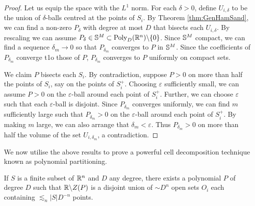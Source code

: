\begin{proof}
    Let us equip the space with the $L^1$ norm.
    For each $\delta>0$, define $U_{i, \delta}$ to be the union of $\delta$-balls centred at the points of $S_i$. 
    By Theorem \ref{thm:GenHamSand}, we can find a non-zero $P_{\delta}$ with degree at most $D$ that bisects each $U_{i, \delta}$. 
    By rescaling we can assume $P_{\delta} \in \mathbb S^M \subset \text{Poly}_D (\mathbb R^n) \backslash \{0\}$.
    Since $\mathbb S^M$ compact, we can find a sequence $\delta_m \to 0$ so that $P_{\delta_{m}}$ converges to $P$ in $\mathbb S^M$.
    Since the coefficients of $P_{\delta_{m}}$ converge t1o those of $P$, $P_{\delta_{m}}$ converges to $P$ uniformly on compact sets.

    We claim $P$ bisects each $S_i$. 
    By contradiction, suppose $P>0$ on more than half the points of $S_i$, say on the points of $S_i^+$. 
    Choosing $\varepsilon$ sufficiently small, we can assume $P>0$ on the $\varepsilon$-ball around each point of $S_i^+$.
    Further, we can choose $\varepsilon$ such that each $\varepsilon$-ball is disjoint. 
    Since $P_{\delta_{m}}$ converges uniformly, we can find $m$ sufficiently large such that $P_{\delta_{m}}>0$ 
    on the $\varepsilon$-ball around each point of $S_i^+$.
    By making $m$ large, we can also arrange that $\delta_m < \varepsilon$.
    Thus $P_{\delta_{m}} > 0$ on more than half the volume of the set $U_{i, \delta_{m}}$, a contradiction. 
\end{proof}
We now utilise the above results to prove a powerful cell decomposition technique known as polynomial partitioning.
\begin{theorem}
    If $S$ is a finite subset of $\mathbb R^n$ and $D$ any degree, there exists
    a polynomial $P$ of degree $D$ such that $\mathbb R \backslash Z(P)$ is a disjoint union of $\sim D^n$ open sets $O_i$ each containing
    $\lesssim_n |S|D^{-n}$ points. \label{thm:PolyPartioning}
 \end{theorem}
 
